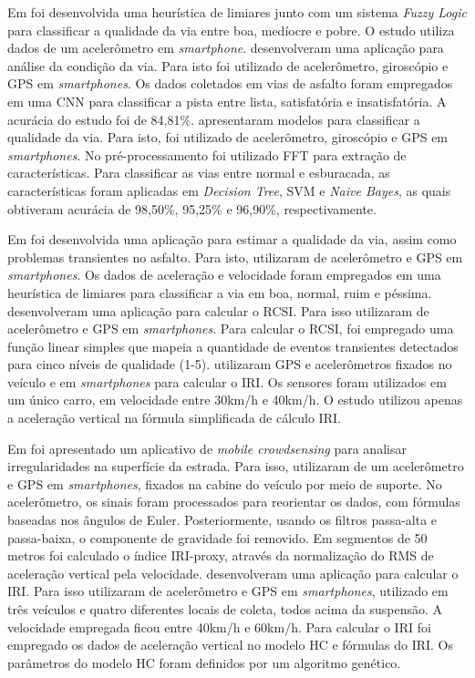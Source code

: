 Em  foi desenvolvida uma heurística de limiares junto com um sistema \textit{Fuzzy Logic} para classificar a qualidade da via entre boa, medíocre e pobre. O estudo utiliza dados de um acelerômetro em \textit{smartphone}.  desenvolveram uma aplicação para análise da condição da via. Para isto foi utilizado de acelerômetro, giroscópio e GPS em \textit{smartphones}. Os dados coletados em vias de asfalto foram empregados em uma CNN para classificar a pista entre lista, satisfatória e insatisfatória. A acurácia do estudo foi de 84,81\%.  apresentaram modelos para classificar a qualidade da via. Para isto, foi utilizado de acelerômetro, giroscópio e GPS em \textit{smartphones}. No pré-processamento foi utilizado FFT para extração de características. Para classificar as vias entre normal e esburacada, as características foram aplicadas em \textit{Decision Tree}, SVM e \textit{Naive Bayes}, as quais obtiveram acurácia de 98,50\%, 95,25\% e 96,90\%, respectivamente.

Em   foi desenvolvida uma aplicação para estimar a qualidade da via, assim como problemas transientes no asfalto. Para isto, utilizaram de acelerômetro e GPS em \textit{smartphones}. Os dados de aceleração e velocidade foram empregados em uma heurística de limiares para classificar a via em boa, normal, ruim e péssima.
 desenvolveram uma aplicação para calcular o RCSI. Para isso utilizaram de acelerômetro e GPS em \textit{smartphones}. Para calcular o RCSI, foi empregado uma função linear simples que mapeia a quantidade de eventos transientes detectados para cinco níveis de qualidade (1-5).  utilizaram GPS e acelerômetros fixados no veículo e em \textit{smartphones} para calcular o IRI. Os sensores foram utilizados em um único carro, em velocidade entre 30km/h e 40km/h. O estudo utilizou apenas a aceleração vertical na fórmula simplificada de cálculo IRI. 

Em  foi apresentado um aplicativo de \textit{mobile crowdsensing} para analisar irregularidades na superfície da estrada. Para isso, utilizaram de um acelerômetro e GPS em \textit{smartphones}, fixados na cabine do veículo por meio de suporte. No acelerômetro, os sinais foram processados para reorientar os dados, com fórmulas baseadas nos ângulos de Euler. Posteriormente, usando os filtros passa-alta e passa-baixa, o componente de gravidade foi removido. Em segmentos de 50 metros foi calculado o índice IRI-proxy, através da normalização do RMS de aceleração vertical pela velocidade.  desenvolveram uma aplicação para calcular o IRI. Para isso utilizaram de acelerômetro e GPS em \textit{smartphones}, utilizado em três veículos e quatro diferentes locais de coleta, todos acima da suspensão. A velocidade empregada ficou entre 40km/h e 60km/h. Para calcular o IRI foi empregado os dados de aceleração vertical no modelo HC e fórmulas do IRI. Os parâmetros do modelo HC foram definidos por um algoritmo genético.


